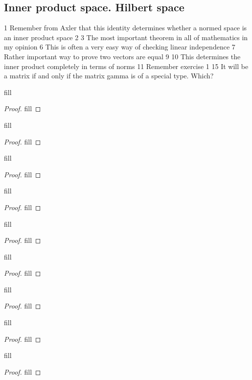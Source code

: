 \subsection{Inner product space. Hilbert space}

1 Remember from Axler that this identity determines whether a normed space is an inner product space
2 
3 The most important theorem in all of mathematics in my opinion
6 This is often a very easy way of checking linear independence 
7 Rather important way to prove two vectors are equal
9
10 This determines the inner product completely in terms of norms
11 Remember exercise 1
15 It will be a matrix if and only if the matrix gamma is of a special type. Which?

\begin{exercise}{1}
fill
\end{exercise}
\begin{proof}
fill
\end{proof}

\begin{exercise}{2}
fill
\end{exercise}
\begin{proof}
fill
\end{proof}

\begin{exercise}{3}
fill
\end{exercise}
\begin{proof}
fill
\end{proof}

\begin{exercise}{6}
fill
\end{exercise}
\begin{proof}
fill
\end{proof}

\begin{exercise}{7}
fill
\end{exercise}
\begin{proof}
fill
\end{proof}

\begin{exercise}{9}
fill
\end{exercise}
\begin{proof}
fill
\end{proof}

\begin{exercise}{10}
fill
\end{exercise}
\begin{proof}
fill
\end{proof}

\begin{exercise}{11}
fill
\end{exercise}
\begin{proof}
fill
\end{proof}

\begin{exercise}{15}
fill
\end{exercise}
\begin{proof}
fill
\end{proof}
